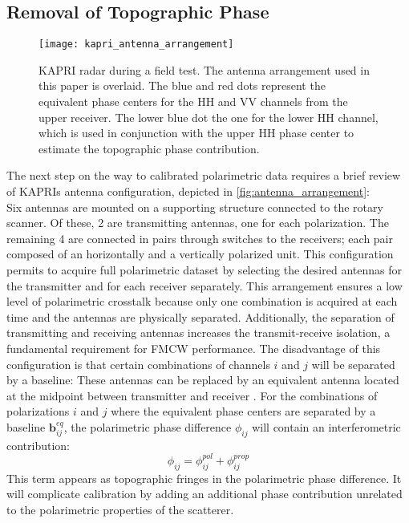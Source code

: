 \subsection{Removal of Topographic Phase}\label{sec:methods:topo_removal}
\begin{figure}[ht]
	\centering
	\texttt{[image: kapri\_antenna\_arrangement]}
	\caption{KAPRI radar during a field test. The antenna arrangement used in this paper is overlaid. The blue and red dots represent the equivalent phase centers for the  HH and VV channels from the upper receiver. The lower blue dot the one for the lower HH channel, which is used in conjunction with the upper HH phase center to estimate the topographic phase contribution.}
	\label{fig:antenna_arrangement}
\end{figure}
 The next step on the way to calibrated polarimetric data requires a brief review of KAPRIs antenna configuration, depicted in \autoref{fig:antenna_arrangement}:\\ Six antennas are mounted on a supporting structure connected to the rotary scanner. Of these, 2 are transmitting antennas, one for each polarization. The remaining 4 are connected in pairs through switches to the receivers; each pair composed of an horizontally and a vertically polarized unit. This configuration permits to acquire full polarimetric dataset by selecting the desired antennas for the transmitter and for each receiver separately. This arrangement ensures a low level of polarimetric crosstalk because only one combination is acquired at each time and the antennas are physically separated. Additionally, the separation of transmitting and receiving antennas increases the transmit-receive isolation, a fundamental requirement for FMCW performance\cite{Beasley1990,Stove1992, Strozzi2011}.  The disadvantage of this configuration is that certain combinations of channels $i$ and $j$ will be separated by a baseline:
 These antennas can be replaced by an equivalent antenna located at the midpoint between transmitter and receiver \cite{Pipia2009}. For the combinations of polarizations $i$ and $j$ where the equivalent phase centers are separated by a baseline $\mathbf{b}_{ij}^{eq}$, the polarimetric phase difference 	$\phi_{ij}$  will contain an interferometric contribution:
\begin{equation}
	\phi_{ij} = \phi_{ij}^{pol} + \phi_{ij}^{prop}
\end{equation}
This term appears as topographic fringes in the polarimetric phase difference. It will complicate calibration by adding an additional phase contribution unrelated to the polarimetric properties of the scatterer.\\
